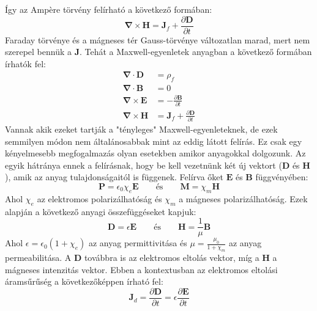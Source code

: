 \documentclass[../main.tex]{subfiles}
\begin{document}
Így az Ampère törvény felírható a következő formában:
\begin{equation}
    \boldsymbol{\nabla} \times \mathbf{H} = \mathbf{J}_f + \frac{\partial \mathbf{D}}{\partial t}
\end{equation}
Faraday törvénye és a mágneses tér Gauss-törvénye változatlan marad, mert nem szerepel bennük a $\mathbf{J}$. Tehát a Maxwell-egyenletek anyagban a következő formában írhatók fel:
\begin{equation}
    \boxed{\begin{aligned}
        \boldsymbol{\nabla} \cdot \mathbf{D} &= \rho_f \\
        \boldsymbol{\nabla} \cdot \mathbf{B} &= 0 \\
        \boldsymbol{\nabla} \times \mathbf{E} &= - \frac{\partial \mathbf{B}}{\partial t} \\
        \boldsymbol{\nabla} \times \mathbf{H} &= \mathbf{J}_f + \frac{\partial \mathbf{D}}{\partial t}
    \end{aligned}}
\end{equation}
Vannak akik ezeket tartják a "tényleges" Maxwell-egyenleteknek, de ezek semmilyen módon nem általánosabbak mint az eddig látott felírás. Ez csak egy kényelmesebb megfogalmazás olyan esetekben amikor anyagokkal dolgozunk.
Az egyik hátránya ennek a felírásnak, hogy be kell vezetnünk két új vektort ($\mathbf{D}$ és $\mathbf{H}$), amik az anyag tulajdonságaitól is függenek. Felírva őket $\mathbf{E}$ és $\mathbf{B}$ függvényében:
\begin{equation}
    \mathbf{P} = \epsilon_0 \chi_e \mathbf{E} \qquad \text{és} \qquad \mathbf{M} = \chi_m \mathbf{H}
\end{equation}
Ahol $\chi_e$ az elektromos polarizálhatóság és $\chi_m$ a mágneses polarizálhatóság. Ezek alapján a következő anyagi összefüggéseket kapjuk:
\begin{equation}
    \mathbf{D} = \epsilon \mathbf{E} \qquad \text{és} \qquad \mathbf{H} = \frac{1}{\mu} \mathbf{B}
\end{equation}
Ahol $\epsilon = \epsilon_0 (1 + \chi_e)$ az anyag permittivitása és $\mu = \frac{\mu_0}{1 + \chi_m}$ az anyag permeabilitása. A $\mathbf{D}$ továbbra is az elektromos eltolás vektor, míg a $\mathbf{H}$ a mágneses intenzitás vektor.
Ebben a kontextusban az elektromos eltolási áramsűrűség a következőképpen írható fel:
\begin{equation}
    \mathbf{J}_d = \frac{\partial \mathbf{D}}{\partial t} = \epsilon \frac{\partial \mathbf{E}}{\partial t}
\end{equation}
\end{document}
